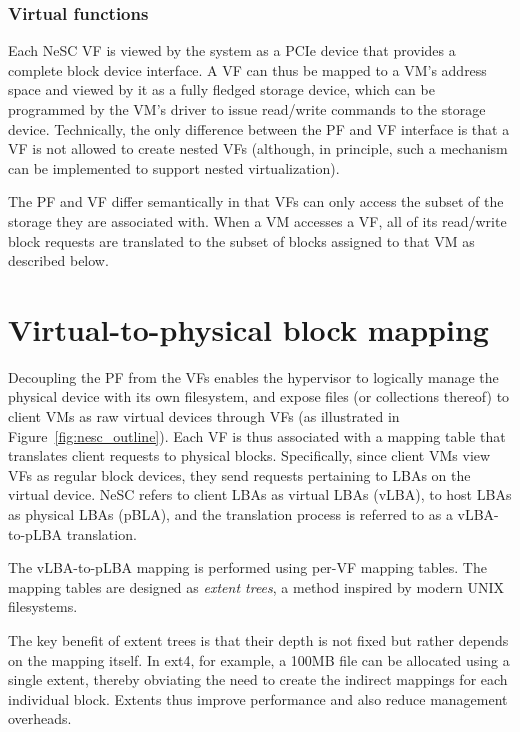\subsubsection*{Virtual functions}
Each NeSC VF is viewed by the system as a PCIe device that provides a complete block device interface. A VF can thus be mapped to a VM's address space and viewed by it as a fully fledged storage device,
which can be programmed by the VM's driver to issue read/write commands to the storage device. Technically, the only difference between the PF and VF interface is that a VF is not allowed to create nested VFs (although, in principle, such a mechanism can be implemented to support nested virtualization).

The PF and VF differ semantically in that VFs can only access the subset of the storage they are associated with. When a VM accesses a VF, all of its read/write block requests are translated to the subset of blocks assigned to that VM as described below.

\section{Virtual-to-physical block mapping}
\label{sec:des:mapping}

Decoupling the PF from the VFs enables the hypervisor to logically manage the physical device with its own filesystem, and expose files (or collections thereof) to client VMs as raw virtual devices through VFs (as illustrated in Figure~\ref{fig:nesc_outline}). Each VF is thus associated with a mapping table that translates client requests to physical blocks. Specifically, since client VMs view VFs as regular block devices, they send requests pertaining to LBAs on the virtual device. NeSC refers to client LBAs as virtual LBAs (vLBA), to host LBAs as physical LBAs (pBLA), and the translation process is referred to as a vLBA-to-pLBA translation.

The vLBA-to-pLBA mapping is performed using per-VF mapping tables. The mapping tables are designed as \emph{extent trees}, a method inspired by modern UNIX filesystems.

The key benefit of extent trees is that their depth is not fixed but rather depends on the mapping itself. In ext4, for example, a 100MB file can be allocated using a single extent, thereby obviating the need to create the indirect mappings for each individual block. Extents thus improve performance and also reduce management overheads.

